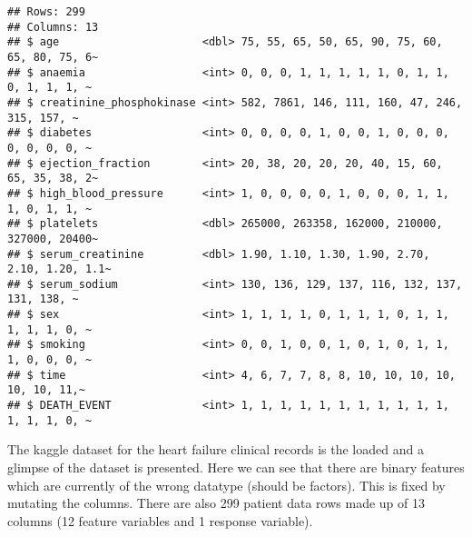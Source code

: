 \documentclass[
]{article}
\begin{document}
\begin{verbatim}
## Rows: 299
## Columns: 13
## $ age                      <dbl> 75, 55, 65, 50, 65, 90, 75, 60, 65, 80, 75, 6~
## $ anaemia                  <int> 0, 0, 0, 1, 1, 1, 1, 1, 0, 1, 1, 0, 1, 1, 1, ~
## $ creatinine_phosphokinase <int> 582, 7861, 146, 111, 160, 47, 246, 315, 157, ~
## $ diabetes                 <int> 0, 0, 0, 0, 1, 0, 0, 1, 0, 0, 0, 0, 0, 0, 0, ~
## $ ejection_fraction        <int> 20, 38, 20, 20, 20, 40, 15, 60, 65, 35, 38, 2~
## $ high_blood_pressure      <int> 1, 0, 0, 0, 0, 1, 0, 0, 0, 1, 1, 1, 0, 1, 1, ~
## $ platelets                <dbl> 265000, 263358, 162000, 210000, 327000, 20400~
## $ serum_creatinine         <dbl> 1.90, 1.10, 1.30, 1.90, 2.70, 2.10, 1.20, 1.1~
## $ serum_sodium             <int> 130, 136, 129, 137, 116, 132, 137, 131, 138, ~
## $ sex                      <int> 1, 1, 1, 1, 0, 1, 1, 1, 0, 1, 1, 1, 1, 1, 0, ~
## $ smoking                  <int> 0, 0, 1, 0, 0, 1, 0, 1, 0, 1, 1, 1, 0, 0, 0, ~
## $ time                     <int> 4, 6, 7, 7, 8, 8, 10, 10, 10, 10, 10, 10, 11,~
## $ DEATH_EVENT              <int> 1, 1, 1, 1, 1, 1, 1, 1, 1, 1, 1, 1, 1, 1, 0, ~
\end{verbatim}

The kaggle dataset for the heart failure clinical records is the loaded
and a glimpse of the dataset is presented. Here we can see that there
are binary features which are currently of the wrong datatype (should be
factors). This is fixed by mutating the columns. There are also 299
patient data rows made up of 13 columns (12 feature variables and 1
response variable).
\end{document}
